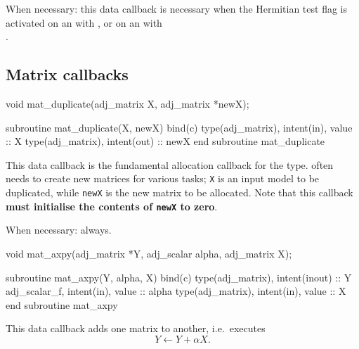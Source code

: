 When necessary: this data callback is necessary when the Hermitian test flag is
activated on an  with ,
or on an  with \\.

\subsection{Matrix callbacks} \label{sec:matrix_callbacks}
\begin{framed}
\begin{minipage}{\columnwidth}
\begin{ccode}
  void mat_duplicate(adj_matrix X, adj_matrix *newX);
\end{ccode}
\begin{fortrancode}
  subroutine mat_duplicate(X, newX) bind(c)
    type(adj_matrix), intent(in), value :: X
    type(adj_matrix), intent(out) :: newX
  end subroutine mat_duplicate
\end{fortrancode}
\end{minipage}
\end{framed}
This data callback is the fundamental allocation callback for the  type. \libadjoint
often needs to create new matrices for various tasks; \texttt{X} is an
input model  to be duplicated, while \texttt{newX} is the new matrix
to be allocated. Note that this callback \textbf{must initialise the contents of \texttt{newX} to zero}.

When necessary: always.
\begin{framed}
\begin{minipage}{\columnwidth}
\begin{ccode}
  void mat_axpy(adj_matrix *Y, adj_scalar alpha, adj_matrix X);
\end{ccode}
\begin{fortrancode}
  subroutine mat_axpy(Y, alpha, X) bind(c)
    type(adj_matrix), intent(inout) :: Y
    adj_scalar_f, intent(in), value :: alpha
    type(adj_matrix), intent(in), value :: X
  end subroutine mat_axpy
\end{fortrancode}
\end{minipage}
\end{framed}
This data callback adds one matrix to another, i.e.\ executes
\begin{equation*}
Y \leftarrow Y + \alpha X.
\end{equation*}

